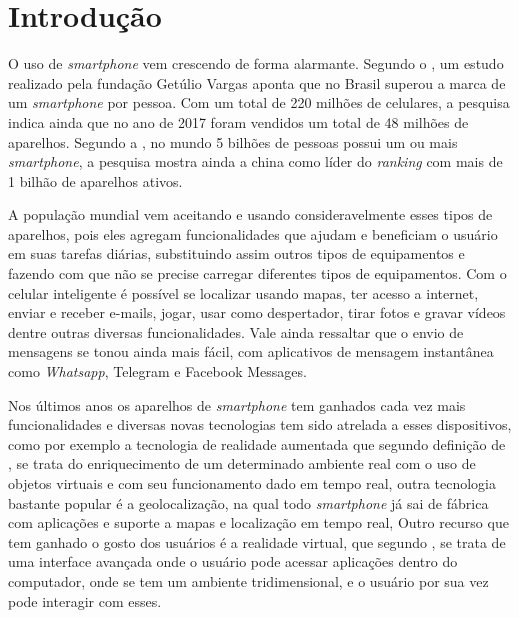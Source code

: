 
\chapter{Introdução}\label{cap:introducao}

%	
O uso de \textit{smartphone} vem crescendo de forma alarmante. Segundo o , um estudo realizado pela fundação Getúlio Vargas aponta que no Brasil superou a marca de um \textit{smartphone} por pessoa. Com um total de 220 milhões de celulares, a pesquisa indica ainda que no ano de 2017 foram vendidos um total de 48 milhões de aparelhos. Segundo a , no mundo 5 bilhões de pessoas possui um ou mais \textit{smartphone}, a pesquisa mostra ainda a china como líder do \textit{ranking} com mais de 1 bilhão de aparelhos ativos.

A população mundial vem aceitando e usando consideravelmente esses tipos de aparelhos, pois eles agregam funcionalidades que ajudam e beneficiam o usuário em suas tarefas diárias, substituindo assim outros tipos de equipamentos e fazendo com que não se precise carregar diferentes tipos de equipamentos. Com o celular inteligente é possível se localizar usando mapas, ter acesso a internet, enviar e receber e-mails, jogar, usar como despertador, tirar fotos e gravar vídeos dentre outras diversas funcionalidades. Vale ainda ressaltar que o envio de mensagens se tonou ainda mais fácil, com aplicativos de mensagem instantânea como \textit{Whatsapp}, Telegram e Facebook Messages.

Nos últimos anos os aparelhos de \textit{smartphone} tem ganhados cada vez mais funcionalidades e diversas novas tecnologias tem sido atrelada a esses dispositivos, como por exemplo a tecnologia de realidade aumentada que segundo definição de  , se trata do enriquecimento de um determinado ambiente real com o uso de objetos virtuais e com seu funcionamento dado em tempo real, outra tecnologia bastante popular é a geolocalização, na qual todo \textit{smartphone} já sai de fábrica com aplicações e suporte a mapas e localização em tempo real, Outro recurso que tem ganhado o gosto dos usuários é a realidade virtual, que segundo , se trata de uma interface avançada onde o usuário pode acessar aplicações dentro do computador, onde se tem um ambiente tridimensional, e o usuário por sua vez pode interagir com esses.
 
